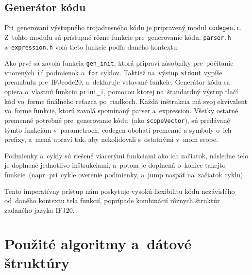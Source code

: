 \documentclass[a4paper, 12pt]{article}[25.11.2020]
\begin{document}
    \subsection{Generátor kódu}
        \par Pri~generovaní výstupného trojadresného kódu je pripravený modul \verb|codegen.c|.
        Z~tohto modulu sú prístupné rôzne funkcie pre~generovanie kódu. \verb|parser.h|
        a~\verb|expression.h| volá tieto funkcie podľa daného kontextu.
        \par Ako prvé sa zavolá funkcia \verb|gen_init|, ktorá pripraví zásobníky pre~počítanie
        vnorených \verb|if| podmienok a~\verb|for| cyklov. Taktiež na~výstup \verb|stdout| 
        vypíše preambulu pre~IFJcode20, a~deklaruje vstavané funkcie.
        Generátor kódu sa opiera o~vlastnú funkciu \verb|print_i|, pomocou ktorej na~štandardný
        výstup tlačí kód vo~forme finálneho reťazca po~riadkoch. Každá inštrukcia má svoj
        ekvivalent vo~forme funkcie, ktorú zavolá spomínaný parser a~expression. Všetky ostatné
        premenné potrebné pre~generovanie kódu~(ako \verb|scopeVector|), sú predávané týmto
        funkciám v~parametroch, codegen obohatí premenné a symboly o~ich prefixy, a~mená upraví
        tak, aby nekolidovali s~ostatnými v~inom scope.
        \par Podmienky a~cykly sú riešené viacerými funkciami ako ich začiatok, následne telo
        je doplnené jednotlivo inštrukciami, a~potom je doplnená o~koniec takejto
        funkcie~(napr. pri~cykle overenie podmienky, a~jump naspäť na~začiatok cyklu). 
        \par Tento imperatívny prístup nám poskytuje vysokú flexibilitu kódu nezávislého
        od~daného kontextu tela funkcií, poprípade kombinácií rôznych štruktúr zadaného jazyka
        IFJ20.

\section{Použité algoritmy a~dátové štruktúry}
\end{document}
